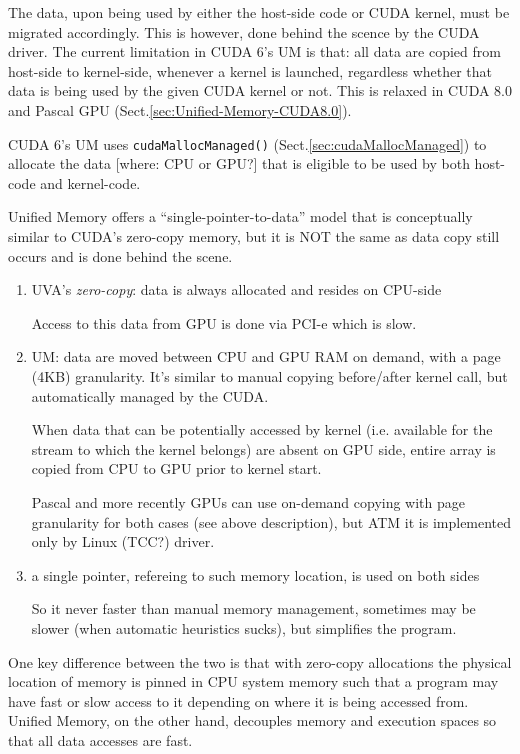 The data, upon being used by either the host-side code or CUDA kernel, must be
migrated accordingly. This is however, done behind the scence by the CUDA
driver. The current limitation in CUDA 6's UM is that:
all data are copied from host-side to kernel-side, whenever a kernel is
launched, regardless whether that data is being used by the given CUDA kernel or
not. This is relaxed in CUDA 8.0 and Pascal GPU
(Sect.\ref{sec:Unified-Memory-CUDA8.0}).


CUDA 6's UM uses \verb!cudaMallocManaged()! (Sect.\ref{sec:cudaMallocManaged}) to
allocate the data [where: CPU or GPU?] that is eligible to be used by both
host-code and kernel-code.

Unified Memory offers a “single-pointer-to-data” model that is conceptually
similar to CUDA’s zero-copy memory, but it is NOT the same as data copy still
occurs and is done behind the scene.
\begin{enumerate}
  
  \item UVA's {\it zero-copy}: data is always allocated and resides on CPU-side
  
  Access to this data from GPU is done via PCI-e which is slow. 
  
  \item UM: data are moved between CPU and GPU RAM on demand, with a page (4KB)
  granularity. It's similar to manual copying before/after kernel call, but
  automatically managed by the CUDA.
  
   When data that can be potentially accessed by kernel (i.e. available for the
   stream to which the kernel belongs) are absent on GPU side, entire array is
   copied from CPU to GPU prior to kernel start.
   
   
Pascal and more recently GPUs can use on-demand copying with page granularity
for both cases (see above description), but ATM it is implemented only by Linux
(TCC?) driver.
  
  \item a single pointer, refereing to such memory location, is used on both sides
  
  So it never faster than manual memory management, sometimes may be slower
  (when automatic heuristics sucks), but simplifies the program.
  
\end{enumerate}

One key difference between the two is that with zero-copy allocations the
physical location of memory is pinned in CPU system memory such that a program
may have fast or slow access to it depending on where it is being accessed from.
Unified Memory, on the other hand, decouples memory and execution spaces so that
all data accesses are fast.

